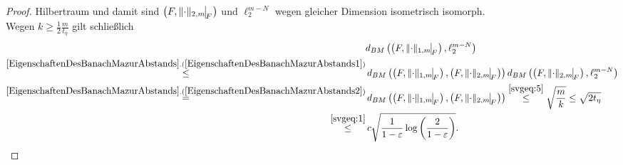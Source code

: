 \begin{proof}
Hilbertraum und damit sind $\left(F,\restrict{\norm\cdot_{2,m}}F\right)$
und $\ell_2^{m-N}$ wegen gleicher Dimension isometrisch isomorph.\\
Wegen $k \ge \frac 1 2 \frac m {t_\eta}$ gilt schließlich
\begin{align*}
&d_{BM}\left(\left(F,\restrict{\norm\cdot_{1,m}}F\right),\ell_2^{m-N} \right)\\
\overset{\refclaim{EigenschaftenDesBanachMazurAbstands}
{EigenschaftenDesBanachMazurAbstands1}}
\le &\, d_{BM}\left(\left(F,\restrict{\norm\cdot_{1,m}}F\right),
                    \left(F,\restrict{\norm\cdot_{2,m}}F\right) \right)
    d_{BM}\left(\left(F,\restrict{\norm\cdot_{2,m}}F\right),
                \ell_2^{m-N} \right)\\
\overset{\refclaim{EigenschaftenDesBanachMazurAbstands}
{EigenschaftenDesBanachMazurAbstands2}}= &\,
d_{BM}\left(\left(F,\restrict{\norm\cdot_{1,m}}F\right),
                    \left(F,\restrict{\norm\cdot_{2,m}}F\right) \right)
 \overset{\eqref{svgeq:5}}\le\sqrt{\frac m k}\le\sqrt{2 t_\eta}\\
\overset{\eqref{svgeq:1}}\le
 &\,c \sqrt{\frac 1 {1-\eps}\log\left(\frac 2 {1-\eps} \right)}
\text.
\end{align*}
\end{proof}